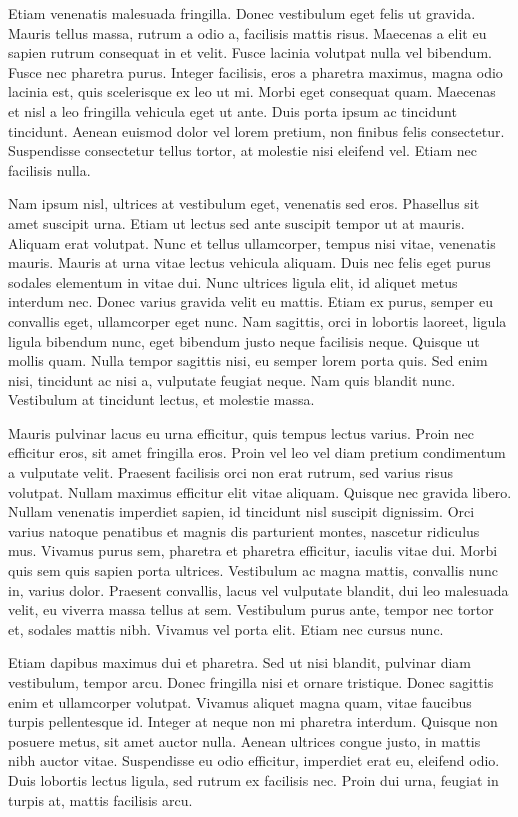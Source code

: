 \documentclass[final,5p,times,twocolumn]{elsarticle}
\begin{document}
Etiam venenatis malesuada fringilla. Donec vestibulum eget felis ut gravida. Mauris tellus massa, rutrum a odio a, facilisis mattis risus. Maecenas a elit eu sapien rutrum consequat in et velit. Fusce lacinia volutpat nulla vel bibendum. Fusce nec pharetra purus. Integer facilisis, eros a pharetra maximus, magna odio lacinia est, quis scelerisque ex leo ut mi. Morbi eget consequat quam. Maecenas et nisl a leo fringilla vehicula eget ut ante. Duis porta ipsum ac tincidunt tincidunt. Aenean euismod dolor vel lorem pretium, non finibus felis consectetur. Suspendisse consectetur tellus tortor, at molestie nisi eleifend vel. Etiam nec facilisis nulla.

Nam ipsum nisl, ultrices at vestibulum eget, venenatis sed eros. Phasellus sit amet suscipit urna. Etiam ut lectus sed ante suscipit tempor ut at mauris. Aliquam erat volutpat. Nunc et tellus ullamcorper, tempus nisi vitae, venenatis mauris. Mauris at urna vitae lectus vehicula aliquam. Duis nec felis eget purus sodales elementum in vitae dui. Nunc ultrices ligula elit, id aliquet metus interdum nec. Donec varius gravida velit eu mattis. Etiam ex purus, semper eu convallis eget, ullamcorper eget nunc. Nam sagittis, orci in lobortis laoreet, ligula ligula bibendum nunc, eget bibendum justo neque facilisis neque. Quisque ut mollis quam. Nulla tempor sagittis nisi, eu semper lorem porta quis. Sed enim nisi, tincidunt ac nisi a, vulputate feugiat neque. Nam quis blandit nunc. Vestibulum at tincidunt lectus, et molestie massa.

Mauris pulvinar lacus eu urna efficitur, quis tempus lectus varius. Proin nec efficitur eros, sit amet fringilla eros. Proin vel leo vel diam pretium condimentum a vulputate velit. Praesent facilisis orci non erat rutrum, sed varius risus volutpat. Nullam maximus efficitur elit vitae aliquam. Quisque nec gravida libero. Nullam venenatis imperdiet sapien, id tincidunt nisl suscipit dignissim. Orci varius natoque penatibus et magnis dis parturient montes, nascetur ridiculus mus. Vivamus purus sem, pharetra et pharetra efficitur, iaculis vitae dui. Morbi quis sem quis sapien porta ultrices. Vestibulum ac magna mattis, convallis nunc in, varius dolor. Praesent convallis, lacus vel vulputate blandit, dui leo malesuada velit, eu viverra massa tellus at sem. Vestibulum purus ante, tempor nec tortor et, sodales mattis nibh. Vivamus vel porta elit. Etiam nec cursus nunc.

Etiam dapibus maximus dui et pharetra. Sed ut nisi blandit, pulvinar diam vestibulum, tempor arcu. Donec fringilla nisi et ornare tristique. Donec sagittis enim et ullamcorper volutpat. Vivamus aliquet magna quam, vitae faucibus turpis pellentesque id. Integer at neque non mi pharetra interdum. Quisque non posuere metus, sit amet auctor nulla. Aenean ultrices congue justo, in mattis nibh auctor vitae. Suspendisse eu odio efficitur, imperdiet erat eu, eleifend odio. Duis lobortis lectus ligula, sed rutrum ex facilisis nec. Proin dui urna, feugiat in turpis at, mattis facilisis arcu. 
\end{document}
